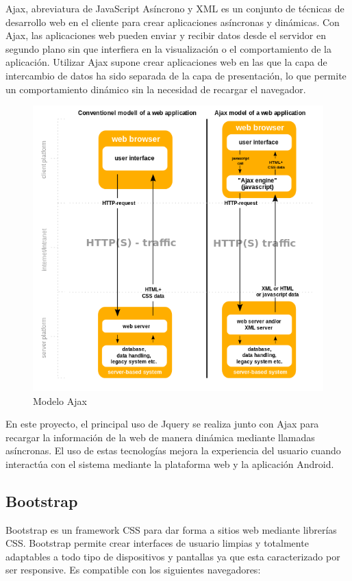\documentclass[a4paper,11pt]{book}
\begin{document}
Ajax\cite{aj}, abreviatura de JavaScript Asíncrono y XML es un conjunto de técnicas de desarrollo web en el cliente para crear aplicaciones asíncronas y dinámicas. Con Ajax, las aplicaciones web pueden enviar y recibir datos desde el servidor en segundo plano sin que interfiera en la visualización o el comportamiento de la aplicación. Utilizar Ajax supone crear aplicaciones web en las que la capa de intercambio de datos ha sido separada de la capa de presentación, lo que permite un comportamiento dinámico sin la necesidad de recargar el navegador. 

\begin{figure}[H] 
\centering 
\includegraphics[scale=0.35]{imagenes/desarrollo_herramienta/ajax.png}
\caption{ Modelo Ajax\cite{aj2}  }  
\end{figure}   

En este proyecto, el principal uso de Jquery se realiza junto con Ajax para recargar la información de la web de manera dinámica mediante llamadas asíncronas. El uso de estas tecnologías mejora la experiencia del usuario cuando interactúa con el sistema mediante la plataforma web y la aplicación Android.


\subsection{Bootstrap}
Bootstrap\cite{boo} es un framework CSS para dar forma a sitios web mediante librerías CSS. Bootstrap  permite crear interfaces de usuario limpias y totalmente adaptables a todo tipo de dispositivos y pantallas ya que esta caracterizado por ser responsive. Es compatible con los siguientes navegadores: 
\end{document}
